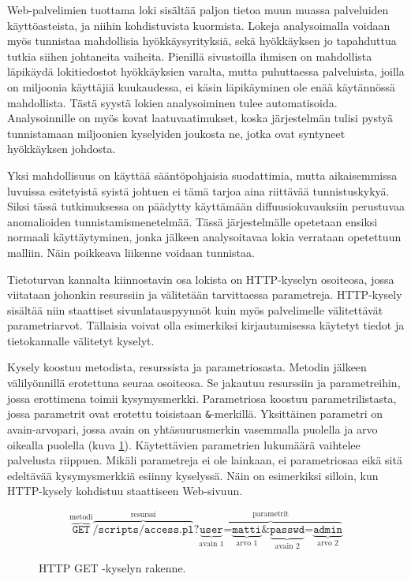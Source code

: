 Web-palvelimien tuottama loki sisältää paljon tietoa muun muassa
palveluiden käyttöasteista, ja niihin kohdistuvista kuormista. Lokeja
analysoimalla voidaan myös tunnistaa mahdollisia hyökkäysyrityksiä,
sekä hyökkäyksen jo tapahduttua tutkia siihen johtaneita
vaiheita. Pienillä sivustoilla ihmisen on mahdollista läpikäydä
lokitiedostot hyökkäyksien varalta, mutta puhuttaessa palveluista,
joilla on miljoonia käyttäjiä kuukaudessa, ei käsin läpikäyminen ole
enää käytännössä mahdollista. Tästä syystä lokien
analysoiminen tulee automatisoida. Analysoinnille on myös kovat
laatuvaatimukset, koska järjestelmän tulisi pystyä tunnistamaan
miljoonien kyselyiden joukosta ne, jotka ovat syntyneet hyökkäyksen
johdosta.

Yksi mahdollisuus on käyttää sääntöpohjaisia suodattimia, mutta
aikaisemmissa luvuissa esitetyistä syistä johtuen ei tämä tarjoa aina riittävää
tunnistuskykyä. Siksi tässä tutkimuksessa on päädytty käyttämään
diffuusiokuvauksiin perustuvaa anomalioiden tunnistamismenetelmää. 
Tässä järjestelmälle opetetaan ensiksi normaali käyttäytyminen, jonka jälkeen analysoitavaa
lokia verrataan opetettuun malliin. Näin poikkeava liikenne voidaan tunnistaa.

Tietoturvan kannalta kiinnostavin osa lokista on HTTP-kyselyn
osoiteosa, jossa viitataan johonkin resurssiin ja välitetään
tarvittaessa parametreja. HTTP-kysely sisältää
niin staattiset sivunlatauspyynnöt kuin myös palvelimelle
välitettävät parametriarvot. Tällaisia voivat olla esimerkiksi
kirjautumisessa käytetyt tiedot ja tietokannalle välitetyt
kyselyt.

Kysely koostuu metodista, resurssista ja parametriosasta.  Metodin
jälkeen välilyönnillä erotettuna seuraa osoiteosa. Se jakautuu
resurssiin ja parametreihin, jossa erottimena toimii kysymysmerkki.
Parametriosa koostuu parametrilistasta, jossa parametrit ovat erotettu
toisistaan \texttt{\&}-merkillä. Yksittäinen parametri on
avain-arvopari, jossa avain on yhtäsuurusmerkin vasemmalla puolella ja
arvo oikealla puolella (kuva \ref{CLF2}). Käytettävien parametrien
lukumäärä vaihtelee palvelusta riippuen. Mikäli parametreja ei ole
lainkaan, ei parametriosaa eikä sitä edeltävää kysymysmerkkiä esiinny
kyselyssä. Näin on esimerkiksi silloin, kun HTTP-kysely kohdistuu
staattiseen Web-sivuun.

\vskip 0.5cm
\begin{figure}[ht]
\[
\overbrace{\texttt{GET}}^\text{metodi}
\overbrace{\texttt{/scripts/access.pl}}^\text{resurssi}
\texttt{?}
\overbrace{\underbrace{\texttt{user}}_\text{avain 1}
\texttt{=}
\underbrace{\texttt{matti}}_\text{arvo 1}
\texttt{\&}
\underbrace{\texttt{passwd}}_\text{avain 2}
\texttt{=}
\underbrace{\texttt{admin}}_\text{arvo 2}}
^{\text{parametrit}}
\]
\caption{HTTP GET -kyselyn rakenne.}
\label{CLF2}
\end{figure}


